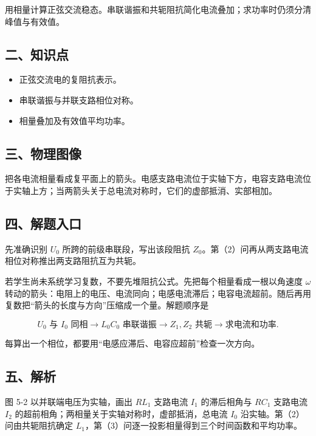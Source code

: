 \documentclass[12pt,a4paper,UTF8]{ctexart}
\newcommand{\tightlist}{\setlength{\itemsep}{0pt}\setlength{\parskip}{0pt}}
\begin{document}
用相量计算正弦交流稳态。串联谐振和共轭阻抗简化电流叠加；求功率时仍须分清峰值与有效值。

\subsection{二、知识点}\label{ux4e8cux77e5ux8bc6ux70b9-4}

\begin{itemize}
\tightlist
\item
  正弦交流电的复阻抗表示。
\item
  串联谐振与并联支路相位对称。
\item
  相量叠加及有效值平均功率。
\end{itemize}

\subsection{三、物理图像}\label{ux4e09ux7269ux7406ux56feux50cf-4}

把各电流相量看成复平面上的箭头。电感支路电流位于实轴下方，电容支路电流位于实轴上方；当两箭头关于总电流对称时，它们的虚部抵消、实部相加。

\subsection{四、解题入口}\label{ux56dbux89e3ux9898ux5165ux53e3-4}

先准确识别 \(U_0\) 所跨的前级串联段，写出该段阻抗
\(Z_0\)。第（2）问再从两支路电流相位对称推出两支路阻抗互为共轭。

若学生尚未系统学习复数，不要先堆阻抗公式。先把每个相量看成一根以角速度
\(\omega\)
转动的箭头：电阻上的电压、电流同向；电感电流滞后；电容电流超前。随后再用复数把``箭头的长度与方向''压缩成一个量。解题顺序是

\[U_0\text{ 与 }I_0\text{ 同相}\to L_0C_0\text{ 串联谐振}\to
Z_1,Z_2\text{ 共轭}\to\text{求电流和功率}.\]

每算出一个相位，都要用``电感应滞后、电容应超前''检查一次方向。

\subsection{五、解析}\label{ux4e94ux89e3ux6790-4}

图 5-2 以并联端电压为实轴，画出 \(RL_1\) 支路电流 \(I_1\) 的滞后相角与
\(RC_1\) 支路电流 \(I_2\)
的超前相角；两相量关于实轴对称时，虚部抵消，总电流 \(I_0\)
沿实轴。第（2）问由共轭阻抗确定
\(L_1\)，第（3）问逐一投影相量得到三个时间函数和平均功率。
\end{document}
